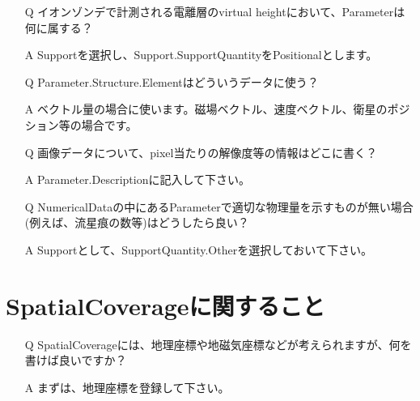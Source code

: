 \begin{screen}
\begin{itemize}
\item[\stepcounter{qq}Q\theqq] イオンゾンデで計測される電離層のvirtual heightにおいて、Parameterは何に属する？
\item[\stepcounter{aa}A\theaa] Supportを選択し、Support.SupportQuantityをPositionalとします。
\end{itemize}
\end{screen}

\begin{screen}
\begin{itemize}
\item[\stepcounter{qq}Q\theqq] Parameter.Structure.Elementはどういうデータに使う？
\item[\stepcounter{aa}A\theaa] ベクトル量の場合に使います。磁場ベクトル、速度ベクトル、衛星のポジション等の場合です。
\end{itemize}
\end{screen}

\begin{screen}
\begin{itemize}
\item[\stepcounter{qq}Q\theqq] 画像データについて、pixel当たりの解像度等の情報はどこに書く？
\item[\stepcounter{aa}A\theaa] Parameter.Descriptionに記入して下さい。
\end{itemize}
\end{screen}

\begin{screen}
\begin{itemize}
\item[\stepcounter{qq}Q\theqq] NumericalDataの中にあるParameterで適切な物理量を示すものが無い場合(例えば、流星痕の数等)はどうしたら良い？
\item[\stepcounter{aa}A\theaa] Supportとして、SupportQuantity.Otherを選択しておいて下さい。
\end{itemize}
\end{screen}

\section{SpatialCoverageに関すること}

\begin{screen}
\begin{itemize}
\item[\stepcounter{qq}Q\theqq] SpatialCoverageには、地理座標や地磁気座標などが考えられますが、何を書けば良いですか？
\item[\stepcounter{aa}A\theaa] まずは、地理座標を登録して下さい。
\end{itemize}
\end{screen}

